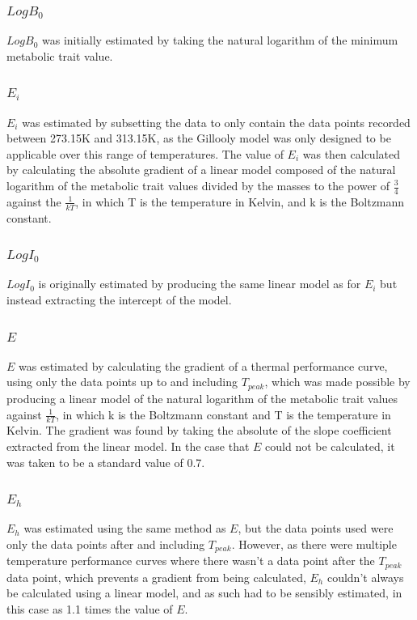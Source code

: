 \documentclass[11pt]{article}
\begin{document}
\begin{linenumbers}
\subsubsection{$LogB_{0}$}
$LogB_{0}$ was initially estimated by taking the natural logarithm of the minimum metabolic trait value.
\subsubsection{$E_{i}$}
$E_{i}$ was estimated by subsetting the data to only contain the data points recorded between 273.15K and 313.15K, as the Gillooly model was only designed to be applicable over this range of temperatures. The value of $E_{i}$ was then calculated by calculating the absolute gradient of a linear model composed of the natural logarithm of the metabolic trait values divided by the masses to the power of $\frac{3}{4}$ against the $\frac{1}{kT}$, in which T is the temperature in Kelvin, and k is the Boltzmann constant.
\subsubsection{$LogI_{0}$}
$LogI_{0}$ is originally estimated by producing the same linear model as for $E_{i}$ but instead extracting the intercept of the model.
\subsubsection{$E$}
$E$ was estimated by calculating the gradient of a thermal performance curve, using only the data points up to and including $T_{peak}$, which was made possible by producing a linear model of the natural logarithm of the metabolic trait values against $\tfrac{1}{kT}$, in which k is the Boltzmann constant and T is the temperature in Kelvin. The gradient was found by taking the absolute of the slope coefficient extracted from the linear model. In the case that $E$ could not be calculated, it was taken to be a standard value of 0.7.
\subsubsection{$E_{h}$}
$E_{h}$ was estimated using the same method as $E$, but the data points used were only the data points after and including $T_{peak}$. However, as there were multiple temperature performance curves where there wasn't a data point after the $T_{peak}$ data point, which prevents a gradient from being calculated, $E_{h}$ couldn't always be calculated using a linear model, and as such had to be sensibly estimated, in this case as 1.1 times the value of $E$.

\end{linenumbers}
\end{document}
